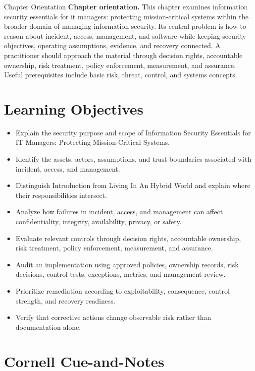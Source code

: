 \documentclass[11pt,letterpaper]{article}
\title{\CornellDocumentTitle}
\author{}
\date{}
\begin{document}
\maketitle
\begin{CornellOverviewBox}{Chapter Orientation}
\textbf{Chapter orientation.} This chapter examines information security essentials for it managers: protecting mission-critical systems within the broader domain of managing information security. Its central problem is how to reason about incident, access, management, and software while keeping security objectives, operating assumptions, evidence, and recovery connected. A practitioner should approach the material through decision rights, accountable ownership, risk treatment, policy enforcement, measurement, and assurance. Useful prerequisites include basic risk, threat, control, and systems concepts.
\end{CornellOverviewBox}
\section*{Learning Objectives}
\begin{itemize}
\item Explain the security purpose and scope of Information Security Essentials for IT Managers: Protecting Mission-Critical Systems.
\item Identify the assets, actors, assumptions, and trust boundaries associated with incident, access, and management.
\item Distinguish Introduction from Living In An Hybrid World and explain where their responsibilities intersect.
\item Analyze how failures in incident, access, and management can affect confidentiality, integrity, availability, privacy, or safety.
\item Evaluate relevant controls through decision rights, accountable ownership, risk treatment, policy enforcement, measurement, and assurance.
\item Audit an implementation using approved policies, ownership records, risk decisions, control tests, exceptions, metrics, and management review.
\item Prioritize remediation according to exploitability, consequence, control strength, and recovery readiness.
\item Verify that corrective actions change observable risk rather than documentation alone.
\end{itemize}
\section*{Cornell Cue-and-Notes}
\end{document}
